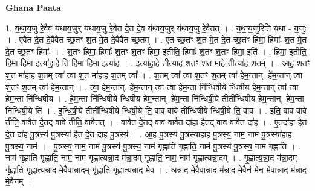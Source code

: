 \documentclass[17pt]{extarticle}
\begin{document}
\textbf{Ghana Paata } \newline

1. य॒था॒य॒जु रे॒वैव य॑थाय॒जुर् य॑थाय॒जु रे॒वैत दे॒त दे॒व य॑थाय॒जुर् य॑थाय॒जु रे॒वैतत् । . य॒था॒य॒जुरिति॑ यथा - य॒जुः । . ए॒वैत दे॒त दे॒वैवैत च्छ॒तꣳ श॒त मे॒त दे॒वैवैत च्छ॒तम् । . ए॒त च्छ॒तꣳ श॒त मे॒त दे॒त च्छ॒तꣳ हिमा॒ हिमाः᳚ श॒त मे॒त दे॒त च्छ॒तꣳ हिमाः᳚ । . श॒तꣳ हिमा॒ हिमाः᳚ श॒तꣳ श॒तꣳ हिमा॒ इतीति॒ हिमाः᳚ श॒तꣳ श॒तꣳ हिमा॒ इति॑ । . हिमा॒ इतीति॒ हिमा॒ हिमा॒ इत्या॑हा॒हे ति॒ हिमा॒ हिमा॒ इत्या॑ह । . इत्या॑हा॒हे तीत्या॑ह श॒तꣳ श॒त मा॒हे तीत्या॑ह श॒तम् । . आ॒ह॒ श॒तꣳ श॒त मा॑हाह श॒तम् त्वा᳚ त्वा श॒त मा॑हाह श॒तम् त्वा᳚ । . श॒तम् त्वा᳚ त्वा श॒तꣳ श॒तम् त्वा॑ हेम॒न्तान्. हे॑म॒न्तान् त्वा॑ श॒तꣳ श॒तम् त्वा॑ हेम॒न्तान् । . त्वा॒ हे॒म॒न्तान्. हे॑म॒न्तान् त्वा᳚ त्वा हेम॒न्ता नि॑न्धिषीये न्धिषीय हेम॒न्तान् त्वा᳚ त्वा हेम॒न्ता नि॑न्धिषीय । . हे॒म॒न्ता नि॑न्धिषीये न्धिषीय हेम॒न्तान्. हे॑म॒न्ता नि॑न्धिषी॒ये तीती᳚न्धिषीय हेम॒न्तान्. हे॑म॒न्ता नि॑न्धिषी॒ये ति॑ । . इ॒न्धि॒षी॒ये तीती᳚न्धिषीये न्धिषी॒ये ति॒ वाव वावे ती᳚न्धिषीये न्धिषी॒ये ति॒ वाव । . इति॒ वाव वावे तीति॒ वावैत दे॒तद् वावे तीति॒ वावैतत् । . वावैत दे॒तद् वाव वावैत दा॑हा है॒तद् वाव वावैत दा॑ह । . ए॒तदा॑हा है॒त दे॒त दा॑ह पु॒त्रस्य॑ पु॒त्रस्या॑ है॒त दे॒त दा॑ह पु॒त्रस्य॑ । . आ॒ह॒ पु॒त्रस्य॑ पु॒त्रस्या॑हाह पु॒त्रस्य॒ नाम॒ नाम॑ पु॒त्रस्या॑हाह पु॒त्रस्य॒ नाम॑ । . पु॒त्रस्य॒ नाम॒ नाम॑ पु॒त्रस्य॑ पु॒त्रस्य॒ नाम॑ गृह्णाति गृह्णाति॒ नाम॑ पु॒त्रस्य॑ पु॒त्रस्य॒ नाम॑ गृह्णाति । . नाम॑ गृह्णाति गृह्णाति॒ नाम॒ नाम॑ गृह्णात्यन्ना॒द म॑न्ना॒दम् गृ॑ह्णाति॒ नाम॒ नाम॑ गृह्णात्यन्ना॒दम् । . गृ॒ह्णा॒त्य॒न्ना॒द म॑न्ना॒दम् गृ॑ह्णाति गृह्णात्यन्ना॒द मे॒वैवान्ना॒दम् गृ॑ह्णाति गृह्णात्यन्ना॒द मे॒व । . अ॒न्ना॒द मे॒वैवान्ना॒द म॑न्ना॒द मे॒वैन॑ मेन मे॒वान्ना॒द म॑न्ना॒द मे॒वैन᳚म् । \newline
\end{document}
